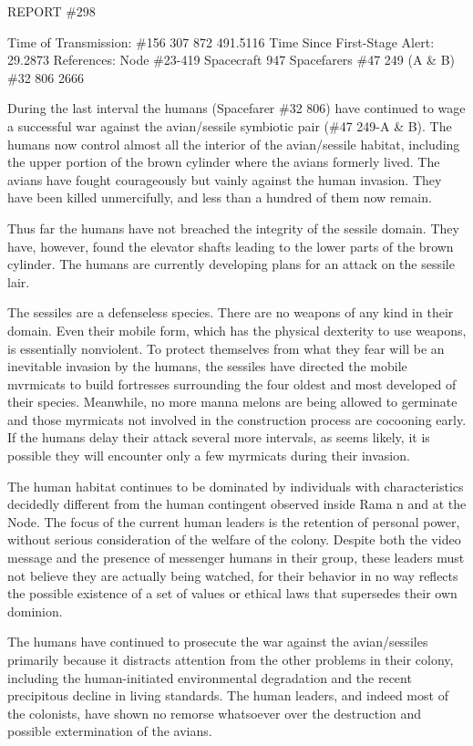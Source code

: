 \documentclass[]{article}
\begin{document}
{{REPORT \#298

Time of Transmission: \#156 307 872 491.5116 Time Since First-Stage Alert: 29.2873 References: Node \#23-419 Spacecraft 947 Spacefarers \#47 249 (A \& B) \#32 806 2666

During the last interval the humans (Spacefarer \#32 806) have continued to wage a successful war against the avian/sessile symbiotic pair (\#47 249-A \& B).  The humans now control almost all the interior of the avian/sessile habitat, including the upper portion of the brown cylinder where the avians formerly lived.  The avians have fought courageously but vainly against the human invasion.  They have been killed unmercifully, and less than a hundred of them now remain.

Thus far the humans have not breached the integrity of the sessile domain.  They have, however, found the elevator shafts leading to the lower parts of the brown cylinder.  The humans are currently developing plans for an attack on the sessile lair.

The sessiles are a defenseless species.  There are no weapons of any kind in their domain.  Even their mobile form, which has the physical dexterity to use weapons, is essentially nonviolent.  To protect themselves from what they fear will be an inevitable invasion by the humans, the sessiles have directed the mobile mvrmicats to build fortresses surrounding the four oldest and most developed of their species.  Meanwhile, no more manna melons are being allowed to germinate and those myrmicats not involved in the construction process are cocooning early.  If the humans delay their attack several more intervals, as seems likely, it is possible they will encounter only a few myrmicats during their invasion.

The human habitat continues to be dominated by individuals with characteristics decidedly different from the human contingent observed inside Rama n and at the Node.  The focus of the current human leaders is the retention of personal power, without serious consideration of the welfare of the colony.  Despite both the video message and the presence of messenger humans in their group, these leaders must not believe they are actually being watched, for their behavior in no way reflects the possible existence of a set of values or ethical laws that supersedes their own dominion.

The humans have continued to prosecute the war against the avian/sessiles primarily because it distracts attention from the other problems in their colony, including the human-initiated environmental degradation and the recent precipitous decline in living standards.  The human leaders, and indeed most of the colonists, have shown no remorse whatsoever over the destruction and possible extermination of the avians.

}}
\end{document}
